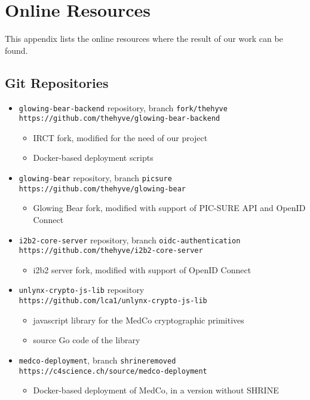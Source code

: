 \chapter{Online Resources}

This appendix lists the online resources where the result of our work can be found.

\section{Git Repositories}
\begin{itemize}
    \item \verb|glowing-bear-backend| repository, branch \verb|fork/thehyve| \\
    \verb|https://github.com/thehyve/glowing-bear-backend|
    \begin{itemize}
        \item IRCT fork, modified for the need of our project
        \item Docker-based deployment scripts
    \end{itemize}
    
    \item \verb|glowing-bear| repository, branch \verb|picsure| \\
    \verb|https://github.com/thehyve/glowing-bear|
    \begin{itemize}
        \item Glowing Bear fork, modified with support of PIC-SURE API and OpenID Connect
    \end{itemize}
    
    \item \verb|i2b2-core-server| repository, branch \verb|oidc-authentication| \\
    \verb|https://github.com/thehyve/i2b2-core-server|
    \begin{itemize}
        \item i2b2 server fork, modified with support of OpenID Connect
    \end{itemize}
    
    \item \verb|unlynx-crypto-js-lib| repository \\
    \verb|https://github.com/lca1/unlynx-crypto-js-lib|
    \begin{itemize}
        \item javascript library for the MedCo cryptographic primitives
        \item source Go code of the library
    \end{itemize}
    
    \item \verb|medco-deployment|, branch \verb|shrineremoved| \\
    \verb|https://c4science.ch/source/medco-deployment|
    \begin{itemize}
        \item Docker-based deployment of MedCo, in a version without SHRINE
    \end{itemize}
    
\end{itemize}

